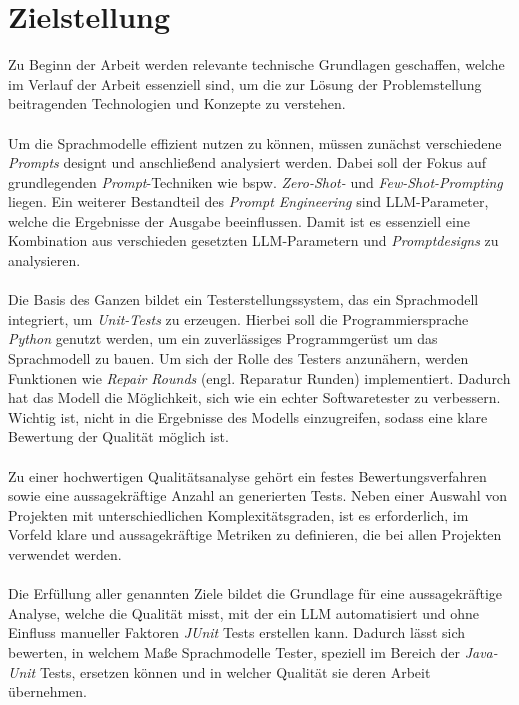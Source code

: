 \section{Zielstellung}\label{sec:goal}
Zu Beginn der Arbeit werden relevante technische Grundlagen geschaffen, welche im Verlauf der Arbeit essenziell sind, um die zur Lösung der Problemstellung beitragenden Technologien und Konzepte zu verstehen.\\\\ Um die Sprachmodelle effizient nutzen zu können, müssen zunächst verschiedene \textit{Prompts} designt und anschließend analysiert werden. Dabei soll der Fokus auf grundlegenden \textit{Prompt}-Techniken wie bspw. \textit{Zero-Shot-} und \textit{Few-Shot-Prompting} liegen. Ein weiterer Bestandteil des \textit{Prompt Engineering} sind LLM-Parameter, welche die Ergebnisse der Ausgabe beeinflussen. Damit ist es essenziell eine Kombination aus verschieden gesetzten LLM-Parametern und \textit{Promptdesigns} zu analysieren.\\\\ Die Basis des Ganzen bildet ein Testerstellungssystem, das ein Sprachmodell integriert, um \textit{Unit-Tests} zu erzeugen. Hierbei soll die Programmiersprache \textit{Python} genutzt werden, um ein zuverlässiges Programmgerüst um das Sprachmodell zu bauen. 
Um sich der Rolle des Testers anzunähern, werden Funktionen wie \textit{Repair Rounds} (engl. Reparatur Runden) implementiert. Dadurch hat das Modell die Möglichkeit, sich wie ein echter Softwaretester zu verbessern. Wichtig ist, nicht in die Ergebnisse des Modells einzugreifen, sodass eine klare Bewertung der Qualität möglich ist.\\\\ Zu einer hochwertigen Qualitätsanalyse gehört ein festes Bewertungsverfahren sowie eine aussagekräftige Anzahl an generierten Tests. Neben einer Auswahl von Projekten mit unterschiedlichen Komplexitätsgraden, ist es erforderlich, im Vorfeld klare und aussagekräftige Metriken zu definieren, die bei allen Projekten verwendet werden.\\\\ Die Erfüllung aller genannten Ziele bildet die Grundlage für eine aussagekräftige Analyse, welche die Qualität misst, mit der ein LLM automatisiert und ohne Einfluss manueller Faktoren \textit{JUnit} Tests erstellen kann. Dadurch lässt sich bewerten, in welchem Maße Sprachmodelle Tester, speziell im Bereich der \textit{Java-Unit} Tests, ersetzen können und in welcher Qualität sie deren Arbeit übernehmen.
